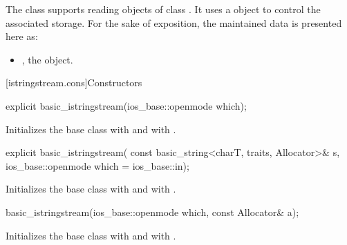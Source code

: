 \pnum
The class
supports reading objects of class
.
It uses a
object to control the associated storage.
For the sake of exposition, the maintained data is presented here as:
\begin{itemize}
\item
{}, the  object.
\end{itemize}

[istringstream.cons]{Constructors}

%
\begin{itemdecl}
explicit basic_istringstream(ios_base::openmode which);
\end{itemdecl}

\begin{itemdescr}
\pnum
\effects
Initializes the base class with
and  with
.
\end{itemdescr}

%
\begin{itemdecl}
explicit basic_istringstream(
  const basic_string<charT, traits, Allocator>& s,
  ios_base::openmode which = ios_base::in);
\end{itemdecl}

\begin{itemdescr}
\pnum
\effects
Initializes the base class with
and  with
\linebreak{}. %
\end{itemdescr}

%
\begin{itemdecl}
basic_istringstream(ios_base::openmode which, const Allocator& a);
\end{itemdecl}

\begin{itemdescr}
\pnum
\effects
Initializes the base class with
and  with
.
\end{itemdescr}

